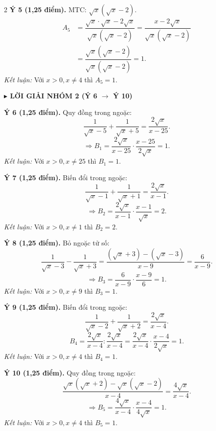 \documentclass[12pt,a4paper]{article}
\begin{document}
\begin{multicols}{2}
\vspace{1mm}
\noindent\textbf{Ý 5 (1,25 điểm).} MTC: $\sqrt{x}(\sqrt{x}-2)$.
\begin{align*}
A_5 &= \dfrac{\sqrt{x} \cdot \sqrt{x} - 2\sqrt{x}}{\sqrt{x}(\sqrt{x}-2)} = \dfrac{x - 2\sqrt{x}}{\sqrt{x}(\sqrt{x}-2)} \\
&= \dfrac{\sqrt{x}(\sqrt{x}-2)}{\sqrt{x}(\sqrt{x}-2)} = 1.
\end{align*}
\textit{Kết luận:} Với $x > 0, x \ne 4$ thì $A_5 = 1$.

\columnbreak

\noindent\textbf{\color{accentred}$\blacktriangleright$ LỜI GIẢI NHÓM 2 (Ý 6 $\to$ Ý 10)}
\vspace{1mm}

\noindent\textbf{Ý 6 (1,25 điểm).} Quy đồng trong ngoặc:
$$\dfrac{1}{\sqrt{x}-5} + \dfrac{1}{\sqrt{x}+5} = \dfrac{2\sqrt{x}}{x-25}.$$
$$\Rightarrow B_1 = \dfrac{2\sqrt{x}}{x-25} \cdot \dfrac{x-25}{2\sqrt{x}} = 1.$$
\textit{Kết luận:} Với $x > 0, x \ne 25$ thì $B_1 = 1$.

\vspace{1mm}
\noindent\textbf{Ý 7 (1,25 điểm).} Biến đổi trong ngoặc:
$$\dfrac{1}{\sqrt{x}-1} + \dfrac{1}{\sqrt{x}+1} = \dfrac{2\sqrt{x}}{x-1}.$$
$$\Rightarrow B_2 = \dfrac{2\sqrt{x}}{x-1} \cdot \dfrac{x-1}{\sqrt{x}} = 2.$$
\textit{Kết luận:} Với $x > 0, x \ne 1$ thì $B_2 = 2$.

\vspace{1mm}
\noindent\textbf{Ý 8 (1,25 điểm).} Bỏ ngoặc tử số:
$$\dfrac{1}{\sqrt{x}-3} - \dfrac{1}{\sqrt{x}+3} = \dfrac{(\sqrt{x}+3)-(\sqrt{x}-3)}{x-9} = \dfrac{6}{x-9}.$$
$$\Rightarrow B_3 = \dfrac{6}{x-9} \cdot \dfrac{x-9}{6} = 1.$$
\textit{Kết luận:} Với $x > 0, x \ne 9$ thì $B_3 = 1$.

\vspace{1mm}
\noindent\textbf{Ý 9 (1,25 điểm).} Biến đổi trong ngoặc:
$$\dfrac{1}{\sqrt{x}-2} + \dfrac{1}{\sqrt{x}+2} = \dfrac{2\sqrt{x}}{x-4}.$$
$$B_4 = \dfrac{2\sqrt{x}}{x-4} : \dfrac{2\sqrt{x}}{x-4} = \dfrac{2\sqrt{x}}{x-4} \cdot \dfrac{x-4}{2\sqrt{x}} = 1.$$
\textit{Kết luận:} Với $x > 0, x \ne 4$ thì $B_4 = 1$.

\vspace{1mm}
\noindent\textbf{Ý 10 (1,25 điểm).} Quy đồng trong ngoặc:
$$\dfrac{\sqrt{x}(\sqrt{x}+2) - \sqrt{x}(\sqrt{x}-2)}{x-4} = \dfrac{4\sqrt{x}}{x-4}.$$
$$\Rightarrow B_5 = \dfrac{4\sqrt{x}}{x-4} \cdot \dfrac{x-4}{4\sqrt{x}} = 1.$$
\textit{Kết luận:} Với $x > 0, x \ne 4$ thì $B_5 = 1$.

\end{multicols}
\endgroup
\end{document}
